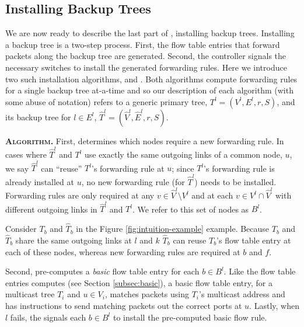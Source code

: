 

\subsection{Installing Backup Trees}
\label{subsec:install-backups}

We are now ready to describe the last part of \mdrs, installing backup trees.  %
Installing a backup tree is a two-step process. First, the flow table entries that forward packets along the backup tree are generated.  Second, the 
controller signals the necessary switches to install the generated forwarding rules.  Here we introduce two such installation algorithms, \pre and \posts.
Both algorithms compute forwarding rules for a single backup tree at-a-time and so
our description of each algorithm (with some abuse of notation) refers to a generic primary tree, $T^l = (V^l,E^l,r,S)$, and its backup tree for $l \in E^l$, $\hat{T}^l=(\hat{V}^l,\hat{E}^l,r,S)$.  

{\bf \post \textsc{Algorithm.}}
First, \post determines which nodes require a new forwarding rule. %
 In cases where $\hat{T}^l$ and $T^l$ use exactly the same outgoing links of a common node, $u$, we say
$\hat{T}^l$ can ``reuse'' $T^l$'s forwarding rule at $u$;  since $T^l$'s forwarding rule is already installed at $u$, no new forwarding rule (for $\hat{T}^l$) needs to be installed. %
Forwarding rules are only required at any $v \in \hat{V}^l \setminus V^l$ and at each $v \in V^l \cap \hat{V}^l$ with different outgoing links in $\hat{T}^l$ and $T^l$.  We refer to this
set of nodes as $B^l$. 

Consider $T_b$ and $\hat{T}_b$ in the Figure \ref{fig:intuition-example} example. Because $T_b$ and $\hat{T}_b$  share the same outgoing links at $l$ and $k$
$\hat{T}_b$ can reuse $T_b$'s flow table entry at each of these nodes, whereas new forwarding rules are required at $b$ and $f$.

Second, \post pre-computes a \emph{basic} flow table entry for each $b \in B^l$.  Like the flow table entries \base computes (see Section \ref{subsec:basic}), a basic flow table
entry, for a multicast tree $T_i$ and $u \in V_i$, matches packets using $T_i$'s multicast address and has instructions to send matching packets out the correct ports at $u$. 
Lastly, when $l$ fails, the \post signals each $b \in B^l$ to install the pre-computed basic flow rule.


